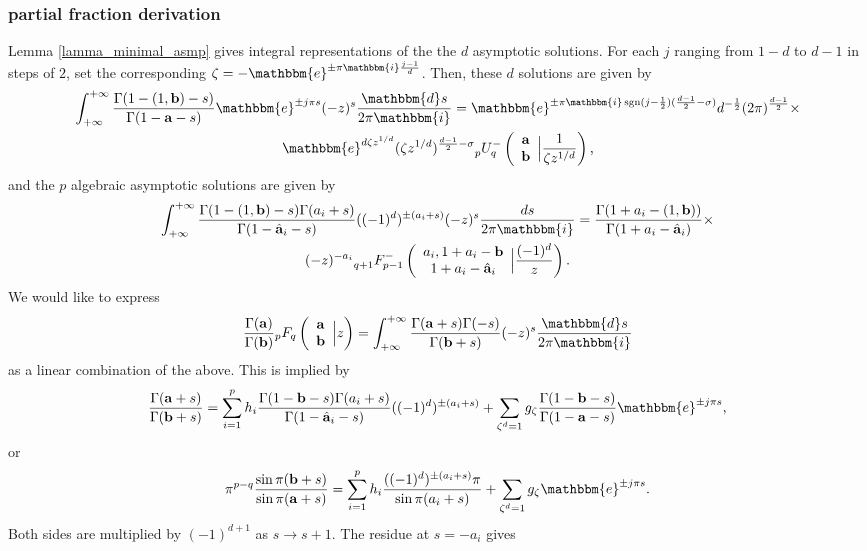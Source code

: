 \documentclass[12pt]{article}
\newcommand{\ee}[0] {\mathbbm{e}}
\newcommand{\ii}[0] {\mathbbm{i}}
\newcommand{\dd}[0] {\mathbbm{d}}
\numberwithin{equation}{section}
\newcommand{\FF}[6] {{}_{#1}{#2}_{#3} \left( \begin{array}{c} #4 \\ #5 \end{array} \Big| {#6}  \right)}
\newcommand{\FFe}[7] {{}_{#1}^{\,}{#2}_{#3}^{#4} \left( \begin{array}{c} #5 \\ #6 \end{array} \Big| {#7} \right)}
\newcommand{\bfa}[0] {\mathbf{a}}
\newcommand{\bfb}[0] {\mathbf{b}}
\begin{document}
\subsubsection{partial fraction derivation}
Lemma \ref{lamma_minimal_asmp} gives integral representations of the the $d$ asymptotic solutions. For each $j$ ranging from $1-d$ to $d-1$ in steps of $2$, set the corresponding $\zeta = -\ee^{\pm \pi \ii \frac{j-1}{d}}$. Then, these $d$ solutions are given by
\begin{gather*}
\int_{+\infty}^{+\infty} \frac{\Gamma(1-(1,\bfb)-s)}{\Gamma(1-\bfa-s)} \ee^{\pm j \pi s} (-z)^s \frac{\dd s}{2\pi \ii} = 
\ee^{\pm \pi \ii \operatorname{sgn}(j-\frac{1}{2}) (\frac{d-1}{2}-\sigma)} d^{-\frac{1}{2}} (2\pi)^{\frac{d-1}{2}} \times \\
\ee^{d \zeta z^{1/d}}(\zeta z^{1/d})^{\frac{d-1}{2}-\sigma} \FFe{p}{U}{q}{-}{\bfa}{\bfb}{\frac{1}{\zeta z^{1/d}}}\text{,}
\end{gather*}
and the $p$ algebraic asymptotic solutions are given by
\begin{gather*}
\int_{+\infty}^{+\infty} \frac{\Gamma(1-(1,\bfb)-s)\Gamma(a_i+s)}{\Gamma(1-\hat{\bfa}_i-s)} ((-1)^d)^{\pm (a_i+s)} (-z)^s \frac{ds}{2\pi \ii} =
\frac{\Gamma(1+a_i-(1,\bfb))}{\Gamma(1+a_i-\hat{\bfa}_i)} \times \\
(-z)^{-a_i} \FFe{q+1}{F}{p-1}{-}{a_i,1+a_i-\mathbf{b}}{1+a_i-\hat{\mathbf{a}}_i}{\frac{(-1)^d}{z}}\text{.}
\end{gather*}
We would like to express
\begin{equation*}
\frac{\Gamma(\mathbf{a})}{\Gamma(\mathbf{b})}\FF{p}{F}{q}{\mathbf{a}}{\mathbf{b}}{z} =  \int_{+ \infty}^{+ \infty} \frac{\Gamma(\mathbf{a}+s) \Gamma(-s)}{\Gamma(\mathbf{b}+s)} (-z)^s \frac{\dd s}{2\pi \ii}
\end{equation*}
as a linear combination of the above. This is implied by
\begin{equation*}
\frac{\Gamma(\mathbf{a}+s)}{\Gamma(\mathbf{b}+s)} = \sum_{i=1}^{p} h_i \frac{\Gamma(1-\bfb-s)\Gamma(a_i+s)}{\Gamma(1-\hat{\bfa}_i-s)} ((-1)^d)^{\pm (a_i+s)} + \sum_{\zeta^d = 1} g_{\zeta} \frac{\Gamma(1-\bfb-s)}{\Gamma(1-\bfa-s)} \ee^{\pm j \pi s}\text{,}
\end{equation*}
or
\begin{equation*}
\pi^{p-q} \frac{\sin \pi(\bfb + s) } {\sin \pi(\bfa + s)}
 = \sum_{i=1}^{p} h_i \frac{((-1)^d)^{\pm (a_i+s)} \pi}{\sin \pi(a_i+s)} + \sum_{\zeta^d = 1} g_{\zeta} \ee^{\pm j \pi s}\text{.}
\end{equation*}
Both sides are multiplied by $(-1)^{d+1}$ as $s \to s+1$. The residue at $s=-a_i$ gives
\end{document}
